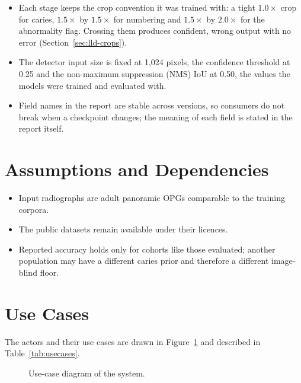 \begin{itemize}
\item Each stage keeps the crop convention it was trained with: a tight $1.0\times$ crop for caries,
  $1.5\times$ by $1.5\times$ for numbering and $1.5\times$ by $2.0\times$ for the abnormality flag.
  Crossing them produces confident, wrong output with no error (Section~\ref{sec:lld-crops}).
\item The detector input size is fixed at 1,024 pixels, the confidence threshold at 0.25 and the non-maximum suppression (NMS)
  IoU at 0.50, the values the models were trained and evaluated with.
\item Field names in the report are stable across versions, so consumers do not break when a
  checkpoint changes; the meaning of each field is stated in the report itself.
\end{itemize}

\section{Assumptions and Dependencies}

\begin{itemize}
\item Input radiographs are adult panoramic OPGs comparable to the training corpora.
\item The public datasets remain available under their licences.
\item Reported accuracy holds only for cohorts like those evaluated; another population may have a
  different caries prior and therefore a different image-blind floor.
\end{itemize}

\section{Use Cases}

The actors and their use cases are drawn in Figure~\ref{fig:usecase} and described in
Table~\ref{tab:usecases}.

\begin{figure}[!htbp]
\centering

\caption[Use-case diagram]{Use-case diagram of the system.}
\label{fig:usecase}
\end{figure}

